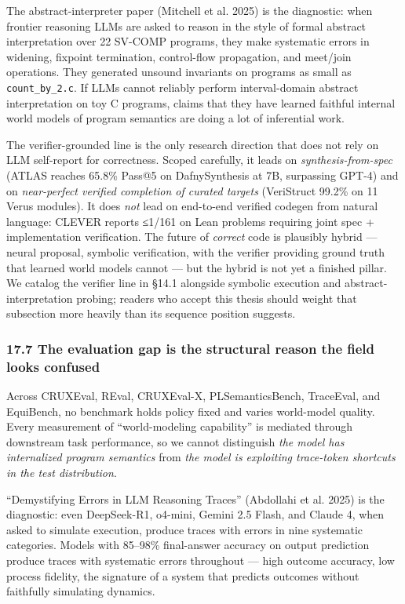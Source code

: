 \documentclass{article}
\begin{document}
The abstract-interpreter paper (Mitchell et al. 2025) is the diagnostic:
when frontier reasoning LLMs are asked to reason in the style of formal
abstract interpretation over 22 SV-COMP programs, they make systematic
errors in widening, fixpoint termination, control-flow propagation, and
meet/join operations. They generated unsound invariants on programs as
small as \texttt{count\_by\_2.c}. If LLMs cannot reliably perform
interval-domain abstract interpretation on toy C programs, claims that
they have learned faithful internal world models of program semantics
are doing a lot of inferential work.

The verifier-grounded line is the only research direction that does not
rely on LLM self-report for correctness. Scoped carefully, it leads on
\emph{synthesis-from-spec} (ATLAS reaches 65.8\% Pass@5 on
DafnySynthesis at 7B, surpassing GPT-4) and on \emph{near-perfect
verified completion of curated targets} (VeriStruct 99.2\% on 11 Verus
modules). It does \emph{not} lead on end-to-end verified codegen from
natural language: CLEVER reports ≤1/161 on Lean problems requiring joint
spec + implementation verification. The future of \emph{correct} code is
plausibly hybrid --- neural proposal, symbolic verification, with the
verifier providing ground truth that learned world models cannot --- but
the hybrid is not yet a finished pillar. We catalog the verifier line in
§14.1 alongside symbolic execution and abstract-interpretation probing;
readers who accept this thesis should weight that subsection more
heavily than its sequence position suggests.

\hypertarget{the-evaluation-gap-is-the-structural-reason-the-field-looks-confused}{%
\subsubsection{17.7 The evaluation gap is the structural reason the
field looks
confused}\label{the-evaluation-gap-is-the-structural-reason-the-field-looks-confused}}

Across CRUXEval, REval, CRUXEval-X, PLSemanticsBench, TraceEval, and
EquiBench, no benchmark holds policy fixed and varies world-model
quality. Every measurement of ``world-modeling capability'' is mediated
through downstream task performance, so we cannot distinguish \emph{the
model has internalized program semantics} from \emph{the model is
exploiting trace-token shortcuts in the test distribution}.

``Demystifying Errors in LLM Reasoning Traces'' (Abdollahi et al. 2025)
is the diagnostic: even DeepSeek-R1, o4-mini, Gemini 2.5 Flash, and
Claude 4, when asked to simulate execution, produce traces with errors
in nine systematic categories. Models with 85--98\% final-answer
accuracy on output prediction produce traces with systematic errors
throughout --- high outcome accuracy, low process fidelity, the
signature of a system that predicts outcomes without faithfully
simulating dynamics.
\end{document}
